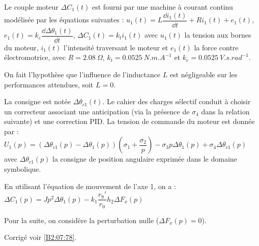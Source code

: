 Le couple moteur $\Delta C_1(t)$ est fourni par une machine à courant continu modélisée par les équations suivantes : 
$u_1(t)=L\dfrac{\dd i_1(t)}{\dd t}  + Ri_1(t)+e_1(t)$, $e_1(t)=k_e \dfrac{\dd \Delta \theta_1(t)}{\dd t}$, $\Delta C_1(t) = k_t i_1(t)$ avec $u_1(t)$ la tension aux bornes du moteur, $i_1(t)$ l’intensité traversant le moteur et $e_1(t)$ la force contre
électromotrice, avec $R=\SI{2,08}{\Omega}$, $k_t = \SI{0,0525}{N.m.A^{-1}}$ et $k_e = \SI{0,0525}{V.s.rad^{-1}}$.

On fait l’hypothèse que l’influence de l’inductance $L$ est négligeable sur les performances attendues, soit $L=0$.

La consigne est notée $\Delta \theta _{c1}(t)$. Le cahier des charges sélectif conduit à choisir un correcteur associant une anticipation (via la présence de $\sigma_4$ dans la relation suivante) et une correction PID. La tension de commande du moteur est donnée par : $U_1(p)=\left( \Delta \theta_{c1}(p)-\Delta \theta_1(p)\right) \left(\sigma_1 + \dfrac{\sigma_2}{p}\right)- \sigma_3p \Delta \theta_1(p)+\sigma_4\Delta \theta_{c1}(p)$
avec $\Delta \theta_{c1}(p)$ la consigne de position angulaire exprimée dans le domaine symbolique.

\ifprof
\begin{corrige}
En utilisant l'équation de mouvement de l'axe 1, on a :
$\Delta C_1(p)=J p ^2  \Delta \theta_1(p) - k_1 \dfrac{r_9'}{r_0}h_2 \Delta F_x(p)$
\end{corrige}
\else
\fi

Pour la suite, on considère la perturbation nulle ($\Delta F_x(p)=0$).



\ifprof
\begin{corrige}
\end{corrige}
\else
\fi



\ifprof
\begin{corrige}
\end{corrige}
\else
\fi



\begin{center}
\end{center}


\ifprof
\else
\begin{flushright}
\footnotesize{Corrigé  voir \ref{B2:07:78}.}
\end{flushright}%
\fi